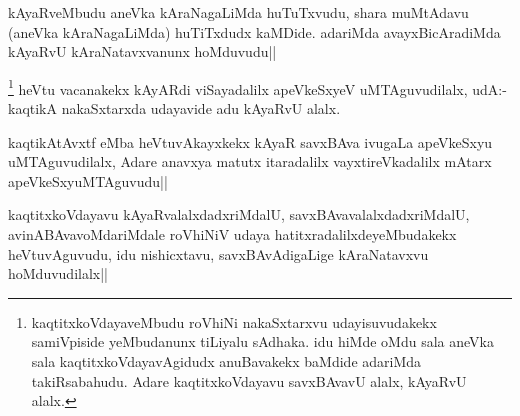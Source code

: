 
\begin{artha}
kAyaRveMbudu aneVka kAraNagaLiMda huTuTxvudu, shara muMtAdavu (aneVka kAraNagaLiMda) huTiTxdudx kaMDide. adariMda avayxBicAradiMda kAyaRvU kAraNatavxvanunx hoMduvudu||
\end{artha}


\begin{artha}
\footnote[1]{kaqtitxkoVdayaveMbudu roVhiNi nakaSxtarxvu udayisuvudakekx samiVpiside yeMbudanunx tiLiyalu sAdhaka. idu hiMde oMdu sala aneVka sala kaqtitxkoVdayavAgidudx anuBavakekx baMdide adariMda takiRsabahudu. Adare kaqtitxkoVdayavu savxBAvavU alalx, kAyaRvU alalx.}
heVtu vacanakekx kAyARdi viSayadalilx apeVkeSxyeV uMTAguvudilalx, udA:-kaqtikA nakaSxtarxda udayavide adu kAyaRvU alalx.
\end{artha}


\begin{artha}
kaqtikAtAvxtf eMba heVtuvAkayxkekx kAyaR savxBAva ivugaLa apeVkeSxyu uMTAguvudilalx, Adare anavxya matutx itaradalilx vayxtireVkadalilx mAtarx apeVkeSxyuMTAguvudu||
\end{artha}


\begin{artha}
kaqtitxkoVdayavu kAyaRvalalxdadxriMdalU, savxBAvavalalxdadxriMdalU, avinABAvavoMdariMdale roVhiNiV udaya hatitxradalilxdeyeMbudakekx heVtuvAguvudu, idu nishicxtavu, savxBAvAdigaLige kAraNatavxvu hoMduvudilalx||
\end{artha}


